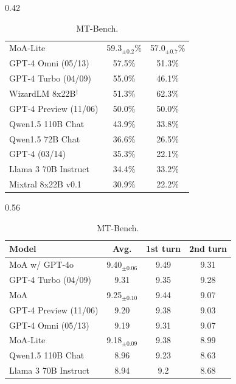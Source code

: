 \documentclass{article}
\begin{document}
\begin{table}[t]
\begin{subtable}{0.42\linewidth}
\begin{tabular}{@{}lcc@{}}
        MoA-Lite            &   59.3$_{\pm \text{0.2}}$\%      & 57.0$_{\pm \text{0.7}}$\%   \\
        GPT-4 Omni (05/13)  &	57.5\%      & 51.3\%   \\
        GPT-4 Turbo (04/09) &	55.0\%	    & 46.1\%   \\
        WizardLM 8x22B$^\dagger$ & 51.3\%       & 62.3\%       \\
        GPT-4 Preview (11/06) &	50.0\%      & 50.0\% \\
        Qwen1.5 110B Chat   &	43.9\%	    & 33.8\% \\
        Qwen1.5 72B Chat    &	36.6\%	    & 26.5\% \\
        GPT-4 (03/14)       &	35.3\%	    & 22.1\% \\
        Llama 3 70B Instruct &	34.4\%	    & 33.2\% \\
        Mixtral 8x22B v0.1  &	30.9\%	    & 22.2\% \\
        \bottomrule
        \end{tabular}
        \label{tab:alpaca_eval}
    \end{subtable}
    \hfill
    \begin{subtable}{0.56\linewidth}
        \centering
        \setlength{\tabcolsep}{4pt}
        \caption{MT-Bench.}
        \begin{tabular}{@{}lccc@{}}
        \toprule
        Model                   &  Avg.         & 1st turn  & 2nd turn \\
        \midrule
        \rowcolor{Gray}
        MoA w/ GPT-4o           & 9.40$_{\pm \text{0.06}}$       & 9.49          & 9.31   \\
        GPT-4 Turbo (04/09)     & 9.31      	    & 9.35          & 9.28          \\
        \rowcolor{Gray}
        MoA{}                   & 9.25$_{\pm \text{0.10}}$       & 9.44          & 9.07            \\
        GPT-4 Preview (11/06)   & 9.20	            & 9.38          & 9.03         \\
        GPT-4 Omni (05/13)      & 9.19              & 9.31          & 9.07         \\
        \rowcolor{Gray}
        MoA-Lite                & 9.18$_{\pm \text{0.09}}$        & 9.38          & 8.99            \\
        Qwen1.5 110B Chat       & 8.96      	    & 9.23          & 8.63          \\
        Llama 3 70B Instruct    & 8.94      	    & 9.2           & 8.68          \\

\end{tabular}
\end{subtable}
\end{table}
\end{document}
